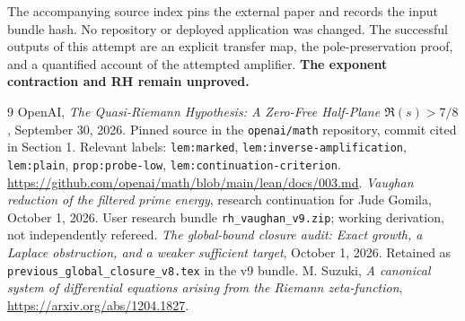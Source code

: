 \documentclass[11pt]{article}
\begin{document}
The accompanying source index pins the external paper and records the
input bundle hash. No repository or deployed application was changed.
The successful outputs of this attempt are an explicit transfer map,
the pole-preservation proof, and a quantified account of the attempted
amplifier. \textbf{The exponent contraction and RH remain unproved.}

\begin{thebibliography}{9}\small
{} OpenAI, \emph{The Quasi-Riemann Hypothesis: A Zero-Free
Half-Plane $\Re(s)>7/8$}, September 30, 2026. Pinned source in the
\texttt{openai/math} repository, commit cited in Section 1. Relevant
labels: \texttt{lem:marked}, \texttt{lem:inverse-amplification},
\texttt{lem:plain}, \texttt{prop:probe-low},
\texttt{lem:continuation-criterion}.
\url{https://github.com/openai/math/blob/main/lean/docs/003.md}.
 \emph{Vaughan reduction of the filtered prime energy},
research continuation for Jude Gomila, October 1, 2026.
User research bundle \texttt{rh\_vaughan\_v9.zip}; working derivation,
not independently refereed.
 \emph{The global-bound closure audit: Exact growth, a Laplace
obstruction, and a weaker sufficient target}, October 1, 2026.
Retained as \texttt{previous\_global\_closure\_v8.tex} in the v9 bundle.
 M. Suzuki, \emph{A canonical system of differential
equations arising from the Riemann zeta-function},
\url{https://arxiv.org/abs/1204.1827}.
\end{thebibliography}
\end{document}

